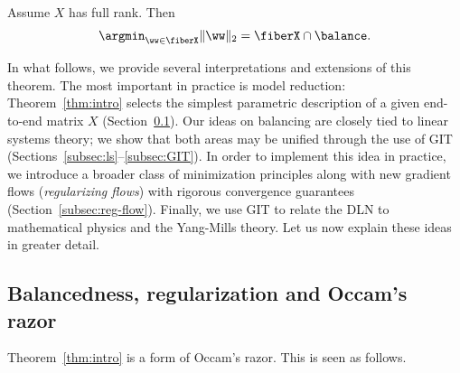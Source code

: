 \begin{theorem}
\label{thm:intro} Assume $X$ has full rank. Then
\begin{equation}
\label{eq:variation1} \argmin_{\ww \in \fiberX} \|\ww\|_2 = \fiberX \cap \balance.
\end{equation}   
\end{theorem}
In what follows, we provide several interpretations and extensions of this theorem. The most important in practice is model reduction: Theorem~\ref{thm:intro} selects the simplest parametric description of a given end-to-end matrix $X$ (Section~\ref{subsec:occam}).  Our ideas on balancing are closely tied to linear systems theory; we show that both areas may be unified through the use of GIT (Sections~\ref{subsec:ls}--\ref{subsec:GIT}). In order to implement this idea in practice, we introduce a broader class of minimization principles along with new gradient flows ({\em regularizing flows\/}) with rigorous convergence guarantees (Section~\ref{subsec:reg-flow}). Finally, we use GIT to relate the DLN to mathematical physics and the Yang-Mills theory. Let us now explain these ideas in greater detail.

\subsection{Balancedness, regularization and Occam's razor}
\label{subsec:occam}
Theorem~\ref{thm:intro} is a form of Occam's razor. This is seen as follows.


